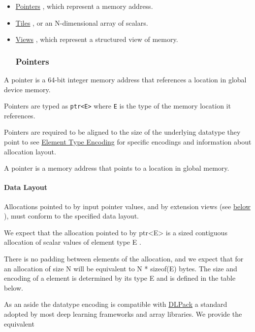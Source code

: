 \documentclass{article}
\begin{document}
\begin{itemize}
\item \href{https://docs.nvidia.com/cuda/tile-ir/latest/sections/types.html#type-ptr}{Pointers} , which represent a memory address.
\item \href{https://docs.nvidia.com/cuda/tile-ir/latest/sections/types.html#type-tile}{Tiles} , or an N-dimensional array of scalars.
\item \href{https://docs.nvidia.com/cuda/tile-ir/latest/sections/types.html#type-views}{Views} , which represent a structured view of memory.

\subsubsection{Pointers}

\end{itemize}
A pointer is a 64-bit integer memory address that references a location in global device memory.

Pointers are typed as \texttt{ptr<E>} where \texttt{E} is the type of the memory location it references.

Pointers are required to be aligned to the size of the underlying datatype they point to see \href{https://docs.nvidia.com/cuda/tile-ir/latest/sections/semantics.html#element-type-encoding}{Element Type Encoding} for specific encodings and information about allocation layout.


A pointer is a memory address that points to a location in global memory.


\paragraph{Data Layout}

Allocations pointed to by input pointer values, and by extension views (see \href{https://docs.nvidia.com/cuda/tile-ir/latest/sections/types.html#type-views}{below} ), must conform to the specified data layout.


We expect that the allocation pointed to by ptr<E> is a sized contiguous allocation of scalar values of element type E .


There is no padding between elements of the allocation, and we expect that for an allocation of size N will be equivalent to N * sizeof(E) bytes. The size and encoding of a element is determined by its type E and is defined in the table below.


As an aside the datatype encoding is compatible with \href{https://github.com/dmlc/dlpack}{DLPack} a standard adopted by most deep learning frameworks and array libraries. We provide the equivalent
\end{document}
